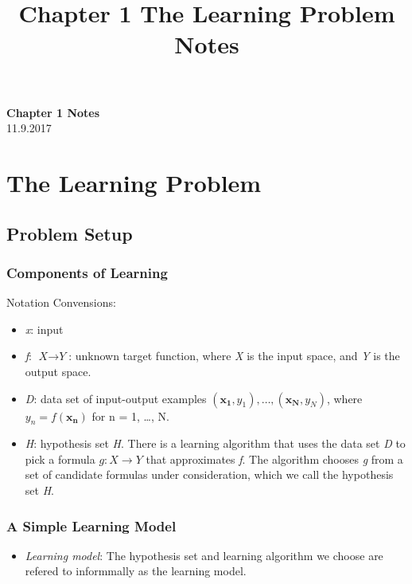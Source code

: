 \documentclass[11pt]{article}
\theoremstyle{definition}
\numberwithin{equation}{section}
\begin{document}
\setcounter{section}{0}
\title{Chapter 1 The Learning Problem Notes}

\thispagestyle{empty}

\begin{center}
{\LARGE \bf Chapter 1 Notes}\\
11.9.2017
\end{center}
\section{The Learning Problem}
\subsection{Problem Setup}
\subsubsection{Components of Learning}
Notation Convensions:
\begin{itemize}[noitemsep,topsep=0pt]
    \itemsep-1em
    \item \textit{x}: input\\
    \item \textit{f}: $\textit{X} \rightarrow \textit{Y}$: unknown target function, where \textit{X} is the input space, and \textit{Y} is the output space.\\
    \item \textit{D}: data set of input-output examples $(\mathbf{x_1}, y_1), \ldots, (\mathbf{x_N}, y_N)$, where $y_n = f(\mathbf{x_n})$ for n = 1, \ldots, N. \\
    \item \textit{H}: hypothesis set \textit{H}. There is a learning algorithm that uses the data set \textit{D} to pick a formula $\textit{g}: \textit{X} \rightarrow \textit{Y}$ that approximates \textit{f}. The algorithm chooses \textit{g} from a set of candidate formulas under consideration, which we call the hypothesis set \textit{H}.
\end{itemize}


\subsubsection{A Simple Learning Model}
\begin{itemize}[noitemsep, topsep=0pt]
    \item \textit{Learning model}: The hypothesis set and learning algorithm we choose are refered to informmally as the learning model.
\end{itemize}
\end{document}
